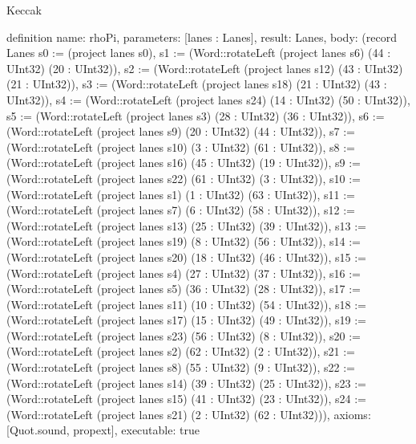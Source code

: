 \begin{lexlean}{Keccak}
\begin{semanticmodule}
definition{
  name: rhoPi,
  parameters: [lanes : Lanes],
  result: Lanes,
  body: (record Lanes {s0 := (project lanes s0), s1 := (Word::rotateLeft (project lanes s6) (44 : UInt32) (20 : UInt32)), s2 := (Word::rotateLeft (project lanes s12) (43 : UInt32) (21 : UInt32)), s3 := (Word::rotateLeft (project lanes s18) (21 : UInt32) (43 : UInt32)), s4 := (Word::rotateLeft (project lanes s24) (14 : UInt32) (50 : UInt32)), s5 := (Word::rotateLeft (project lanes s3) (28 : UInt32) (36 : UInt32)), s6 := (Word::rotateLeft (project lanes s9) (20 : UInt32) (44 : UInt32)), s7 := (Word::rotateLeft (project lanes s10) (3 : UInt32) (61 : UInt32)), s8 := (Word::rotateLeft (project lanes s16) (45 : UInt32) (19 : UInt32)), s9 := (Word::rotateLeft (project lanes s22) (61 : UInt32) (3 : UInt32)), s10 := (Word::rotateLeft (project lanes s1) (1 : UInt32) (63 : UInt32)), s11 := (Word::rotateLeft (project lanes s7) (6 : UInt32) (58 : UInt32)), s12 := (Word::rotateLeft (project lanes s13) (25 : UInt32) (39 : UInt32)), s13 := (Word::rotateLeft (project lanes s19) (8 : UInt32) (56 : UInt32)), s14 := (Word::rotateLeft (project lanes s20) (18 : UInt32) (46 : UInt32)), s15 := (Word::rotateLeft (project lanes s4) (27 : UInt32) (37 : UInt32)), s16 := (Word::rotateLeft (project lanes s5) (36 : UInt32) (28 : UInt32)), s17 := (Word::rotateLeft (project lanes s11) (10 : UInt32) (54 : UInt32)), s18 := (Word::rotateLeft (project lanes s17) (15 : UInt32) (49 : UInt32)), s19 := (Word::rotateLeft (project lanes s23) (56 : UInt32) (8 : UInt32)), s20 := (Word::rotateLeft (project lanes s2) (62 : UInt32) (2 : UInt32)), s21 := (Word::rotateLeft (project lanes s8) (55 : UInt32) (9 : UInt32)), s22 := (Word::rotateLeft (project lanes s14) (39 : UInt32) (25 : UInt32)), s23 := (Word::rotateLeft (project lanes s15) (41 : UInt32) (23 : UInt32)), s24 := (Word::rotateLeft (project lanes s21) (2 : UInt32) (62 : UInt32))}),
  axioms: [Quot.sound, propext],
  executable: true
}


\end{semanticmodule}
\end{lexlean}
